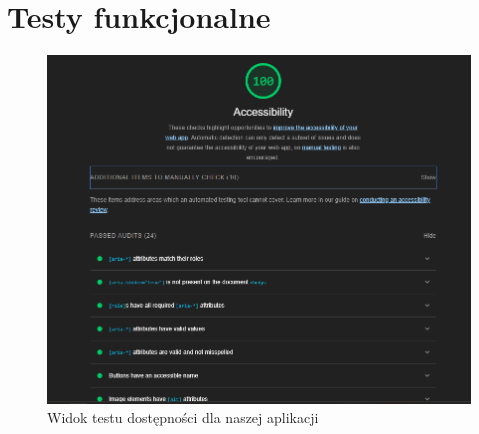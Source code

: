 \section{Testy funkcjonalne}
\label{sec:testy-funkcjonalne}

\begin{figure}[H]
    \centering
    \includegraphics[width=1\textwidth]{attachments/testy-dostepnosci}
    \caption{Widok testu dostępności dla naszej aplikacji}
    \label{fig:testy-dostepnosci}
    \end{figure}
